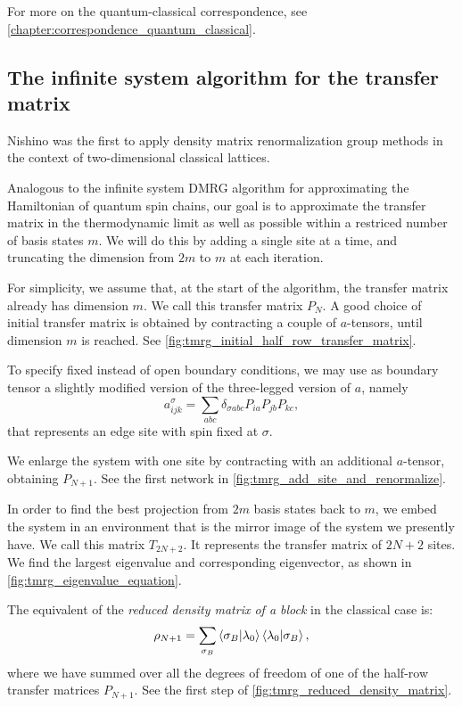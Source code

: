 For more on the quantum-classical correspondence, see
\autoref{chapter:correspondence_quantum_classical}.

\subsection{The infinite system algorithm for the transfer matrix}
Nishino \cite{nishino1995density, nishino1996corner} was the first to apply density matrix
renormalization group methods in the context of two-dimensional classical
lattices.

Analogous to the infinite system DMRG algorithm for approximating the Hamiltonian of
quantum spin chains, our goal is to
approximate the transfer matrix in the thermodynamic limit as well as possible within a
restriced number of basis states $m$. We will do this by adding a single site at a time,
and truncating the dimension from $2m$ to $m$ at each iteration.

For simplicity, we assume that, at the start of the algorithm, the transfer matrix already
has dimension $m$. We call this transfer matrix $P_N$. A good choice of initial
transfer matrix is obtained by contracting a couple of $a$-tensors, until dimension $m$ is
reached. See \autoref{fig:tmrg_initial_half_row_transfer_matrix}.

To specify fixed instead of open boundary conditions, we may use as boundary tensor a
slightly modified version of the three-legged version of $a$, namely
\begin{equation}
  a_{i j k}^{\sigma} = \sum_{a b c} \delta_{\sigma a b c} P_{i a}P_{j b}P_{k c},
\end{equation}
that represents an edge site with spin fixed at $\sigma$.

We enlarge the system with one site by contracting with an additional $a$-tensor,
obtaining $P_{N + 1}$. See the first network in
\autoref{fig:tmrg_add_site_and_renormalize}.

In order to find the best projection from $2m$ basis states back to $m$, we embed the
system in an environment that is the mirror image of the system we presently have. We call
this matrix $T_{2N + 2}$. It represents the transfer matrix of $2N + 2$ sites. We find the
largest eigenvalue and corresponding eigenvector, as shown in
\autoref{fig:tmrg_eigenvalue_equation}.

The equivalent of the \textit{reduced density matrix of a
block} in the classical case is:
\begin{equation}\label{eq:reduced_density_matrix_classical_case}
  \rho_{N + 1} = \sum_{\sigma_B} \braket{\sigma_B | \lambda_0}\braket{\lambda_0 |
  \sigma_B},
\end{equation}
where we have summed over all the degrees of freedom of one of the half-row transfer
matrices $P_{N+1}$. See the first step of \autoref{fig:tmrg_reduced_density_matrix}.

